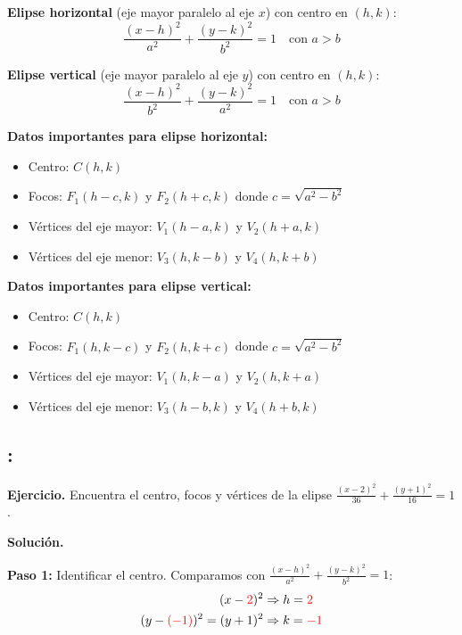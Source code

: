 \documentclass[12pt,a4paper]{article}
\begin{document}
	\textbf{Elipse horizontal} (eje mayor paralelo al eje $x$) con centro en $(h,k)$:
	\[
	\boxed{\frac{(x-h)^2}{a^2}+\frac{(y-k)^2}{b^2}=1} \quad\text{con }a>b
	\]

	\textbf{Elipse vertical} (eje mayor paralelo al eje $y$) con centro en $(h,k)$:
	\[
	\boxed{\frac{(x-h)^2}{b^2}+\frac{(y-k)^2}{a^2}=1} \quad\text{con }a>b
	\]

	\textbf{Datos importantes para elipse horizontal:}
	\begin{itemize}
		\item Centro: $C(h,k)$
		\item Focos: $F_1(h-c,k)$ y $F_2(h+c,k)$ donde $c=\sqrt{a^2-b^2}$
		\item Vértices del eje mayor: $V_1(h-a,k)$ y $V_2(h+a,k)$
		\item Vértices del eje menor: $V_3(h,k-b)$ y $V_4(h,k+b)$
	\end{itemize}

	\textbf{Datos importantes para elipse vertical:}
	\begin{itemize}
		\item Centro: $C(h,k)$
		\item Focos: $F_1(h,k-c)$ y $F_2(h,k+c)$ donde $c=\sqrt{a^2-b^2}$
		\item Vértices del eje mayor: $V_1(h,k-a)$ y $V_2(h,k+a)$
		\item Vértices del eje menor: $V_3(h-b,k)$ y $V_4(h+b,k)$
	\end{itemize}

	\subsection*{{\color{blue!40!red}{Ejemplo 3}}: \color{blue!80!black}{Elipse horizontal con centro fuera del origen}}

	\textbf{Ejercicio.} Encuentra el centro, focos y vértices de la elipse $\displaystyle\frac{(x-2)^2}{36}+\frac{(y+1)^2}{16}=1$.

	\bigskip

	\textbf{Solución.}

	\bigskip

	\textbf{Paso 1:} Identificar el centro. Comparamos con $\displaystyle\frac{(x-h)^2}{a^2}+\frac{(y-k)^2}{b^2}=1$:
	\[
	\begin{aligned}
		(x-{\color{red}{2}})^2&\Rightarrow h={\color{red}{2}}\\
		(y-{\color{red}{(-1)}})^2=(y+1)^2&\Rightarrow k={\color{red}{-1}}
	\end{aligned}
	\]
\end{document}
